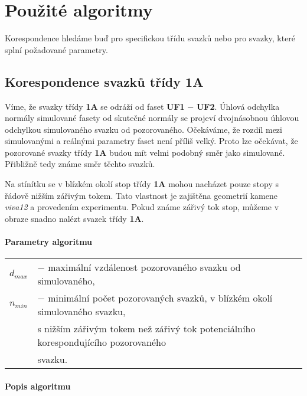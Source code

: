 	 

\section{Použité algoritmy}
	Korespondence hledáme buď pro specifickou třídu svazků nebo pro svazky, které splní požadované parametry. 

\subsection{Korespondence svazků třídy \textbf{1A}}
\label{sec: 1A}

Víme, že svazky třídy \textbf{1A} se odráží od faset \textbf{UF1} $-$ \textbf{UF2}. Úhlová odchylka normály simulované fasety od  skutečné normály se projeví dvojnásobnou úhlovou odchylkou simulovaného svazku od pozorovaného. Očekáváme, že rozdíl mezi simulovanými a reálnými parametry faset není příliš velký. Proto lze očekávat, že pozorované svazky třídy \textbf{1A} budou mít velmi podobný směr jako simulované. Přibližně tedy známe směr těchto svazků.

Na stínítku se v blízkém okolí stop třídy \textbf{1A} mohou nacházet pouze stopy s řádově nižším zářivým tokem. Tato vlastnost je zajištěna geometrií kamene \textit{viva12} a provedením experimentu. Pokud známe zářivý tok stop, můžeme v obraze snadno nalézt svazek třídy \textbf{1A}. 

\paragraph{Parametry algoritmu}
\hspace{1mm}
	 
	 \begin{tabular}{l L{14cm}}
	 $d_{max}$ & $-$ maximální vzdálenost pozorovaného svazku od simulovaného,\\
	 $n_{min}$ & $-$ minimální počet pozorovaných svazků, v blízkém okolí simulovaného svazku,\\ 
	           &s nižším zářivým tokem než zářivý tok potenciálního korespondujícího pozorovaného \\
	           &svazku. \\
	 \end{tabular}
	
\paragraph{Popis algoritmu} 

